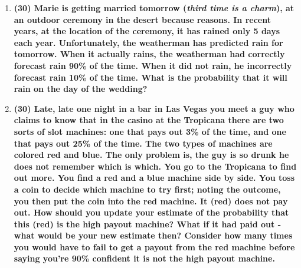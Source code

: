 \documentclass[11pt,a4paper]{article}
\begin{document}
\begin{enumerate}[leftmargin=*,topsep=0pt,font=\bfseries]
        \newpage
    \item\textbf{(30) Marie is getting married tomorrow (\textit{third time is a charm}), at an outdoor ceremony in the desert because reasons. In recent years, at the location of the ceremony, it has rained only 5 days each year. Unfortunately, the weatherman has predicted rain for tomorrow. When it actually rains, the weatherman had correctly forecast rain 90\% of the time. When it did not rain, he incorrectly forecast rain 10\% of the time. What is the probability that it will rain on the day of the wedding?}
        \vspace{\baselineskip}

















        \newpage
    \item\textbf{(30) Late, late one night in a bar in Las Vegas you meet a guy who claims to know that in the casino at the Tropicana there are two sorts of slot machines: one that pays out 3\% of the time, and one that pays out 25\% of the time. The two types of machines are colored red and blue. The only problem is, the guy is so drunk he does not remember which is which. You go to the Tropicana to find out more. You find a red and a blue machine side by side. You toss a coin to decide which machine to try first; noting the outcome, you then put the coin into the red machine. It (red) does not pay out. How should you update your estimate of the probability that this (red) is the high payout machine? What if it had paid out - what would be your new estimate then? Consider how many times you would have to fail to get a payout from the red machine before saying you're 90\% confident it is not the high payout machine.}
        \vspace{\baselineskip}

















\end{enumerate}

\newpage 


\setlength{\bibhang}{0pt}

\end{document}
